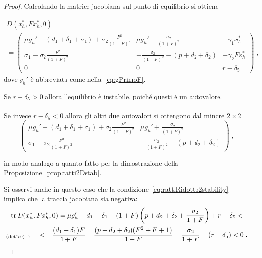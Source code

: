 \begin{proof}
Calcolando la matrice jacobiana sul punto di equilibrio si ottiene

\begin{multline*}
D (x_h^* , F x_h^* , 0) = \\
=
\begin{pmatrix}
    \mu g_h' - (d_1 +\delta_1 +\sigma_1) + \sigma_2 \frac{F^2}{(1+F)^2} &
    \mu g_h' + \frac{\sigma_2}{(1+F)^2} &
    -\gamma_1 x_h^*
    \\
    \sigma_1 - \sigma_2 \frac{F^2}{(1+F)^2} &
    - \frac{\sigma_2}{(1+F)^2} - ( p +d_2 +\delta_2) &
    - \gamma_2 F x_h^*
    \\
    0 &
    0 &
    r -\delta_5
    \end{pmatrix}
    \; ,
\end{multline*}
dove $g_h'$ è abbreviata come nella~\eqref{eq:gPrimoF}.

Se $r -\delta_5 > 0$ allora l'equilibrio è instabile, poiché questi è un autovalore.

\paragraph{}
Se invece $r - \delta_5 <0$ allora gli altri due autovalori si ottengono dal minore $2 \times 2$
$$ %
\begin{pmatrix}
    \mu g_h' - (d_1 +\delta_1 +\sigma_1) + \sigma_2 \frac{F^2}{(1+F)^2} &
    \mu g_h' + \frac{\sigma_2}{(1+F)^2}
    \\
    \sigma_1 - \sigma_2 \frac{F^2}{(1+F)^2} &
    - \frac{\sigma_2}{(1+F)^2} - ( p +d_2 +\delta_2)
    \end{pmatrix}
    \; ,
$$

in modo analogo a quanto fatto
per la dimostrazione della Proposizione~\ref{prop:ratti2Dstab}.

Si osservi anche in questo caso che la condizione~\eqref{eq:rattiRidotto2stability} implica che la traccia
jacobiana sia negativa:
\begin{multline*}
\operatorname{tr} D (x_h^* , F x_h^* , 0) = \mu g_h' - d_1 -\delta_1 - (1+F) \left( p + d_2 + \delta_2 + \frac{\sigma_2}{1+F} \right)
+ r - \delta_5 < \\
 _{(\det >0) \rightarrow} \quad
< - \frac{(d_1+\delta_1) F}{1+F} - \frac{(p +d_2+\delta_2) (F^2 +F+1)}{1+F} - \frac{\sigma_2}{1+F}  + (r -\delta_5) < 0 \; .
\end{multline*}

\end{proof}

